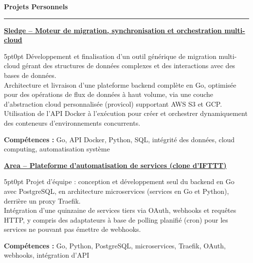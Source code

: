 \documentclass[9pt]{extarticle}
\begin{document}
\par\vspace{5pt}

{\large\bfseries Projets Personnels}
\par\vspace{-8pt}
\rule{\linewidth}{0.4pt}
\par\vspace{5pt}

\underline{\bfseries Sledge -- Moteur de migration, synchronisation et orchestration multi-cloud}
\par
\begin{adjustwidth}{5pt}{0pt}
    Développement et finalisation d'un outil générique de migration multi-cloud gérant des structures de données complexes et des interactions avec des bases de données. \\
    Architecture et livraison d'une plateforme backend complète en Go, optimisée pour des opérations de flux de données à haut volume, via une couche d'abstraction cloud personnalisée ({\ttfamily provicol}) supportant AWS S3 et GCP. \\
    Utilisation de l'API Docker à l'exécution pour créer et orchestrer dynamiquement des conteneurs d'environnements concurrents.
\end{adjustwidth}
\par
{\bfseries Compétences :} Go, API Docker, Python, SQL, intégrité des données, cloud computing, automatisation système

\par\vspace{8pt}

\underline{\bfseries Area -- Plateforme d'automatisation de services (clone d'IFTTT)}
\par
\begin{adjustwidth}{5pt}{0pt}
    Projet d'équipe : conception et développement seul du backend en Go avec PostgreSQL, en architecture microservices (services en Go et Python), derrière un proxy Traefik. \\
    Intégration d'une quinzaine de services tiers via OAuth, webhooks et requêtes HTTP, y compris des adaptateurs à base de polling planifié (cron) pour les services ne pouvant pas émettre de webhooks.
\end{adjustwidth}
\par
{\bfseries Compétences :} Go, Python, PostgreSQL, microservices, Traefik, OAuth, webhooks, intégration d'API

\par\vspace{8pt}
\end{document}
